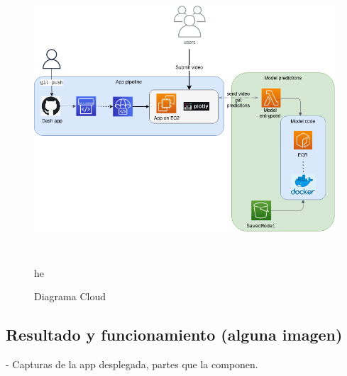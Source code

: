 \begin{figure}[H]
    \centering
		\includegraphics[height=10cm, width=12cm]{figs/cloud_diagram.png}
\caption{Diagrama Cloud}\label{cloud_diagram}

he

\end{figure}

\subsection{Resultado y funcionamiento (alguna imagen)}

- Capturas de la app desplegada, partes que la componen.
